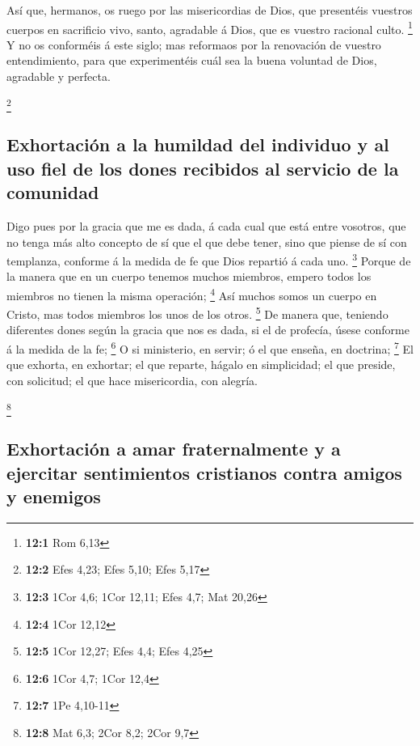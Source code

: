  Así que, hermanos, os ruego por las misericordias de Dios,
que presentéis vuestros cuerpos en sacrificio vivo, santo, agradable á
Dios, que es vuestro racional culto. \footnote{\textbf{12:1} Rom 6,13}
 Y no os conforméis á este siglo; mas reformaos por la
renovación de vuestro entendimiento, para que experimentéis cuál sea la
buena voluntad de Dios, agradable y perfecta.

\footnote{\textbf{12:2} Efes 4,23; Efes 5,10; Efes 5,17}

\hypertarget{exhortaciuxf3n-a-la-humildad-del-individuo-y-al-uso-fiel-de-los-dones-recibidos-al-servicio-de-la-comunidad}{%
\subsection{Exhortación a la humildad del individuo y al uso fiel de los
dones recibidos al servicio de la
comunidad}\label{exhortaciuxf3n-a-la-humildad-del-individuo-y-al-uso-fiel-de-los-dones-recibidos-al-servicio-de-la-comunidad}}

 Digo pues por la gracia que me es dada, á cada cual que
está entre vosotros, que no tenga más alto concepto de sí que el que
debe tener, sino que piense de sí con templanza, conforme á la medida de
fe que Dios repartió á cada uno. \footnote{\textbf{12:3} 1Cor 4,6; 1Cor
  12,11; Efes 4,7; Mat 20,26}  Porque de la manera que en un
cuerpo tenemos muchos miembros, empero todos los miembros no tienen la
misma operación; \footnote{\textbf{12:4} 1Cor 12,12}  Así
muchos somos un cuerpo en Cristo, mas todos miembros los unos de los
otros. \footnote{\textbf{12:5} 1Cor 12,27; Efes 4,4; Efes 4,25}
 De manera que, teniendo diferentes dones según la gracia
que nos es dada, si el de profecía, úsese conforme á la medida de la fe;
\footnote{\textbf{12:6} 1Cor 4,7; 1Cor 12,4}  O si
ministerio, en servir; ó el que enseña, en doctrina; \footnote{\textbf{12:7}
  1Pe 4,10-11}  El que exhorta, en exhortar; el que reparte,
hágalo en simplicidad; el que preside, con solicitud; el que hace
misericordia, con alegría.

\footnote{\textbf{12:8} Mat 6,3; 2Cor 8,2; 2Cor 9,7}

\hypertarget{exhortaciuxf3n-a-amar-fraternalmente-y-a-ejercitar-sentimientos-cristianos-contra-amigos-y-enemigos}{%
\subsection{Exhortación a amar fraternalmente y a ejercitar sentimientos
cristianos contra amigos y
enemigos}\label{exhortaciuxf3n-a-amar-fraternalmente-y-a-ejercitar-sentimientos-cristianos-contra-amigos-y-enemigos}}

